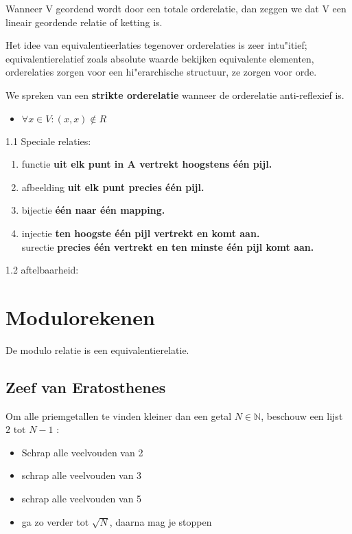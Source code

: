 \documentclass{report}
\begin{document}
Wanneer V geordend wordt door een totale orderelatie, dan zeggen we dat V een lineair geordende relatie of ketting is.

Het idee van equivalentieerlaties tegenover orderelaties is zeer intu"itief; equivalentierelatief zoals absolute waarde bekijken equivalente elementen, orderelaties zorgen voor een hi"erarchische structuur, ze zorgen voor orde.


We spreken van een \textbf{strikte orderelatie} wanneer de orderelatie anti-reflexief is.
\begin{itemize}
	\item $\forall x \in V:  (x,x)\notin R$
\end{itemize}



\begin{Besluit}
	\begin{itemize}
	
		1.1 Speciale relaties: \\
		\begin{enumerate}
			\item functie \implies \textbf{ uit elk punt in A vertrekt hoogstens één pijl.} \\
			\item afbeelding \implies \textbf{ uit elk punt precies één pijl.} \\
			\item bijectie \implies \textbf{één naar één mapping.} \\
			\item injectie \implies \textbf{ten hoogste één pijl vertrekt en komt aan.}\\
				\itemi surectie \implies \textbf{precies één vertrekt en ten minste één pijl komt aan.}\\   
		\end{enumerate}

		1.2 aftelbaarheid: \\ 
	\end{itemize}

\end{Besluit}


\chapter{Modulorekenen}
De modulo relatie is een equivalentierelatie.

\section{Zeef van Eratosthenes}
Om alle priemgetallen te vinden kleiner dan een getal $N \in \mathbb{N}$, beschouw een lijst $2 \text{ tot }  N-1$ :
\begin{itemize}
	\item Schrap alle veelvouden van 2
	\item schrap alle veelvouden van 3
	\item schrap alle veelvouden van 5
	\item ga zo verder tot $\sqrt{N} $, daarna mag je stoppen
\end{itemize}
\end{document}
